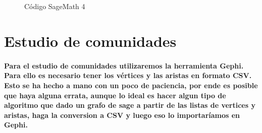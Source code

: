 \documentclass[11pt,spanish]{article}
\begin{document}
\begin{figure}[H]
	\begin{center}
%
	   \\%
	   \\ %
%
	\end{center}
	\caption{%
	Código SageMath 4
 	}%
	\label{fig:codigoSage4}
\end{figure}


\section{Estudio de comunidades}
\paragraph*{Para el estudio de comunidades utilizaremos la herramienta Gephi. 
Para ello es necesario tener los vértices y las aristas en formato CSV.
Esto se ha hecho a mano con un poco de paciencia, por ende es posible que haya alguna errata, 
aunque lo ideal es hacer algun tipo de algoritmo que dado un grafo de sage a partir de las listas de vertices y aristas,
haga la conversion a CSV y luego eso lo importaríamos en Gephi.}
\end{document}
